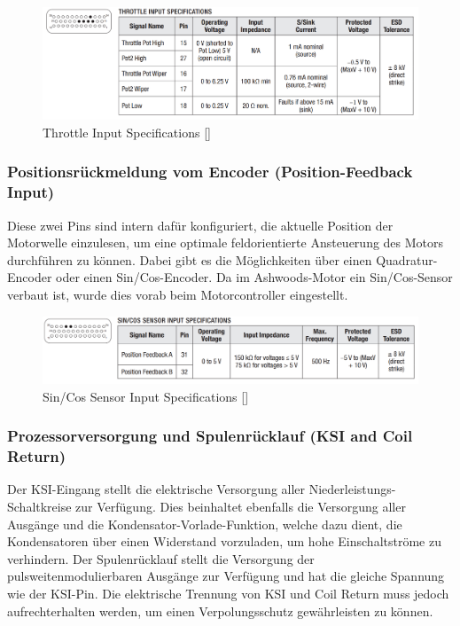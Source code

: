 \begin{figure}[H]
	\begin{center}
		\includegraphics[width=\textwidth]{figures/antrieb/Throttle_Input_Specifications.png}
		\caption{Throttle Input Specifications [\cite{Manual}]}
	\end{center}
\end{figure}



\subsubsection{Positionsrückmeldung vom Encoder (Position-Feedback Input)}
\label{Encoder_Eingang}
Diese zwei Pins sind intern dafür konfiguriert, die aktuelle Position der Motorwelle einzulesen, um eine optimale feldorientierte Ansteuerung des Motors durchführen zu können. Dabei gibt es die Möglichkeiten über einen Quadratur-Encoder oder einen Sin/Cos-Encoder. Da im Ashwoods-Motor ein Sin/Cos-Sensor verbaut ist, wurde dies vorab beim Motorcontroller eingestellt.

\begin{figure}[H]
	\begin{center}
		\includegraphics[width=\textwidth]{figures/antrieb/SinCosSensor_Input_Specifications.png}
		\caption{Sin/Cos Sensor Input Specifications [\cite{Manual}]}
	\end{center}
\end{figure}


\newpage


\subsubsection{Prozessorversorgung und Spulenrücklauf (KSI and Coil Return)}
\label{KSI-Coil_return}
Der KSI-Eingang stellt die elektrische Versorgung aller Niederleistungs-Schaltkreise zur Verfügung. Dies  beinhaltet ebenfalls die Versorgung aller Ausgänge und die Kondensator-Vorlade-Funktion, welche dazu dient, die Kondensatoren über einen Widerstand vorzuladen, um hohe Einschaltströme zu verhindern. Der Spulenrücklauf stellt die Versorgung der pulsweitenmodulierbaren Ausgänge zur Verfügung und hat die gleiche Spannung wie der KSI-Pin. Die elektrische Trennung von KSI und Coil Return muss jedoch aufrechterhalten werden, um einen Verpolungsschutz gewährleisten zu können. 

